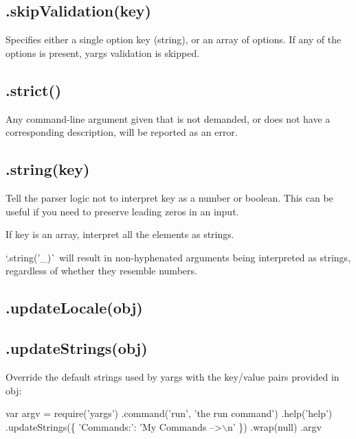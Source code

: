 

\subsection*{\label{_skipValidation}%
.skip\+Validation(key) }

Specifies either a single option key (string), or an array of options. If any of the options is present, yargs validation is skipped.

\subsection*{.strict() }

Any command-\/line argument given that is not demanded, or does not have a corresponding description, will be reported as an error.

\subsection*{\label{_string}%
.string(key) }

Tell the parser logic not to interpret {\ttfamily key} as a number or boolean. This can be useful if you need to preserve leading zeros in an input.

If {\ttfamily key} is an array, interpret all the elements as strings.

`.string('\+\_\+\textquotesingle{})\`{} will result in non-\/hyphenated arguments being interpreted as strings, regardless of whether they resemble numbers.

\subsection*{.update\+Locale(obj) }

\subsection*{.update\+Strings(obj) }

Override the default strings used by yargs with the key/value pairs provided in {\ttfamily obj}\+:


\begin{DoxyCode}
var argv = require('yargs')
  .command('run', 'the run command')
  .help('help')
  .updateStrings(\{
    'Commands:': 'My Commands -->\(\backslash\)n'
  \})
  .wrap(null)
  .argv
\end{DoxyCode}







